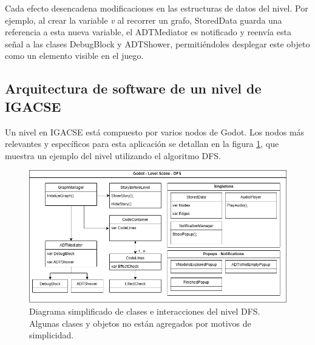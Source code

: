 Cada efecto desencadena modificaciones en las estructuras de datos del nivel. Por ejemplo, al crear la variable \emph{v} al recorrer un grafo, StoredData guarda una referencia a esta nueva variable, el ADTMediator es notificado y reenvía esta señal a las clases DebugBlock y ADTShower, permitiéndoles desplegar este objeto como un elemento visible en el juego.



\subsection{Arquitectura de software de un nivel de IGACSE}


Un nivel en IGACSE está compuesto por varios nodos de Godot. Los nodos más relevantes y específicos para esta aplicación se detallan en la figura \ref{diagram_dfs_level}, que muestra un ejemplo del nivel utilizando el algoritmo DFS.


\begin{figure}[!h]
	\centering
	\includegraphics[scale=.7]{imagenes/level_scene_DFS.png}
	\caption{Diagrama simplificado de clases e interacciones del nivel DFS. Algunas clases y objetos no están agregados por motivos de simplicidad.}
	\label{diagram_dfs_level}
\end{figure}

